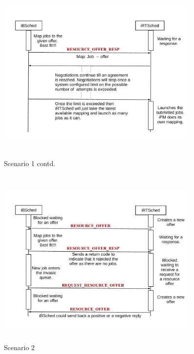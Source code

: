 \begin{figure}[!t]
\vspace{-0.25in}
\centering
\includegraphics[width=0.9\textwidth, height=90mm]{./figures/scenario1contd.pdf}
\caption{Scenario 1 contd.}
\label{fig:Seq2}
\end{figure}
\begin{figure}[!b]
\centering
\includegraphics[width=0.9\textwidth, height=90mm]{./figures/scenario2.pdf}
\caption{Scenario 2}
\label{fig:Seq3}
\end{figure}
